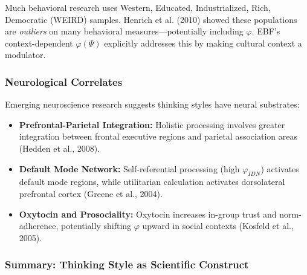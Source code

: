 \begin{note}
Much behavioral research uses Western, Educated, Industrialized, Rich, Democratic (WEIRD) samples. Henrich et al. (2010) showed these populations are \textit{outliers} on many behavioral measures—potentially including $\varphi$. EBF's context-dependent $\varphi(\Psi)$ explicitly addresses this by making cultural context a modulator.
\end{note}

\subsubsection{Neurological Correlates}

Emerging neuroscience research suggests thinking styles have neural substrates:

\begin{itemize}
\item \textbf{Prefrontal-Parietal Integration:} Holistic processing involves greater integration between frontal executive regions and parietal association areas (Hedden et al., 2008).

\item \textbf{Default Mode Network:} Self-referential processing (high $\varphi_{IDN}$) activates default mode regions, while utilitarian calculation activates dorsolateral prefrontal cortex (Greene et al., 2004).

\item \textbf{Oxytocin and Prosociality:} Oxytocin increases in-group trust and norm-adherence, potentially shifting $\varphi$ upward in social contexts (Kosfeld et al., 2005).
\end{itemize}

\subsubsection{Summary: Thinking Style as Scientific Construct}


